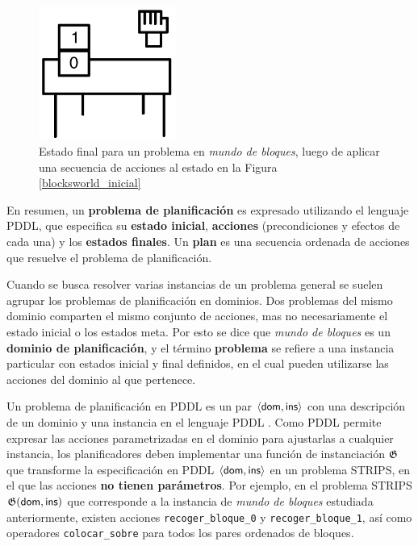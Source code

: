 \begin{figure}[h!]
\centering
\includegraphics[width=0.4\textwidth]{figuras/blocksworld_final.png}
\caption[Estado final en \textit{mundo de bloques}]{Estado final para un problema en \textit{mundo de bloques},
luego de aplicar una secuencia de acciones al estado en la Figura
\ref{blocksworld_inicial}}
\label{blocksworld_final}
\end{figure}

En resumen, un \textbf{problema de planificación} es expresado utilizando
el lenguaje PDDL, que especifica su \textbf{estado inicial}, \textbf{acciones}
(precondiciones y efectos de cada una) y los \textbf{estados finales}.
Un \textbf{plan} es una secuencia ordenada de acciones que resuelve el problema
de planificación.

Cuando se busca resolver varias instancias de un problema general se suelen
agrupar los problemas de planificación en dominios. Dos problemas del mismo
dominio comparten el mismo conjunto de acciones, mas no necesariamente el
estado inicial o los estados meta. Por esto se dice que \textit{mundo de bloques}
es un \textbf{dominio de planificación}, y el término \textbf{problema} se refiere a
una instancia particular con estados inicial y final definidos, en
el cual pueden utilizarse las acciones del dominio al que pertenece.

Un problema de planificación en PDDL es un par $\langle \mathsf{dom},\mathsf{ins} \rangle$ con
una descripción de un dominio y una instancia en el lenguaje PDDL
\citep{mcdermott:pddl,fox:pddl}. Como PDDL permite expresar las acciones
parametrizadas en el dominio para ajustarlas a cualquier instancia, los
planificadores deben implementar una función de instanciación $\mathfrak{G}$ que
transforme la especificación en PDDL $\langle \mathsf{dom},\mathsf{ins} \rangle$ en un problema
STRIPS, en el que las acciones \textbf{no tienen parámetros}. Por ejemplo, en
el problema STRIPS $\mathfrak{G}({\mathsf{dom},\mathsf{ins}})$ que corresponde a la
instancia de \textit{mundo de bloques} estudiada anteriormente, existen
acciones \texttt{recoger\_bloque\_0} y \texttt{recoger\_bloque\_1}, así como
operadores \texttt{colocar\_sobre} para todos los pares ordenados de bloques.

